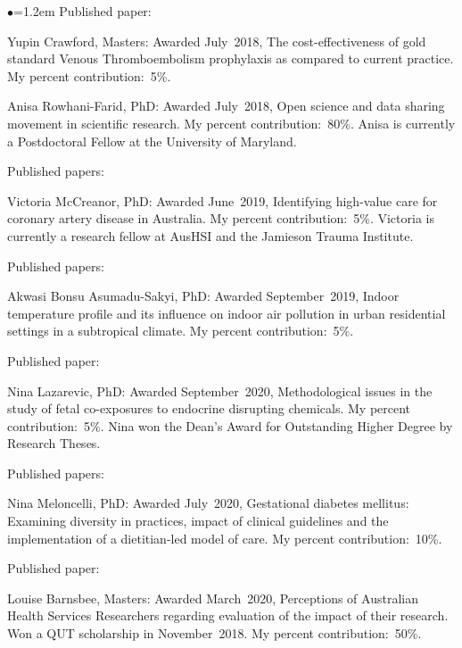\documentclass[a4paper,11pt]{article}
\renewcommand{\labelitemi}{$\bullet$}
\begin{document}
\begin{raggedright}
\begin{list}{\labelitemi}{\leftmargin=1.2em}
Published paper: 

\item Yupin Crawford, Masters: Awarded July~2018, The cost-effectiveness of gold standard Venous Thromboembolism prophylaxis as compared to current practice. My percent contribution:~5\%.

\item Anisa Rowhani-Farid, PhD: Awarded July~2018, Open science and data sharing movement in scientific research. My percent contribution:~80\%. Anisa is currently a Postdoctoral Fellow at the University of Maryland.

Published papers: 

\item Victoria McCreanor, PhD: Awarded June~2019, Identifying high-value care for coronary artery disease in Australia. My percent contribution:~5\%. Victoria is currently a research fellow at AusHSI and the Jamieson Trauma Institute.

Published papers: 

\item Akwasi Bonsu Asumadu-Sakyi, PhD: Awarded September~2019, Indoor temperature profile and its influence on indoor air pollution in urban residential settings in a subtropical climate. My percent contribution:~5\%.

Published paper: 

\item Nina Lazarevic, PhD: Awarded September~2020, Methodological issues in the study of fetal co-exposures to endocrine disrupting chemicals. My percent contribution:~5\%. Nina won the Dean’s Award for Outstanding Higher Degree by Research Theses.

 Published papers: 

\item Nina Meloncelli, PhD: Awarded July~2020, Gestational diabetes mellitus: Examining diversity in practices, impact of clinical guidelines and the implementation of a dietitian-led model of care. My percent contribution:~10\%.

Published paper: 

\item Louise Barnsbee, Masters: Awarded March~2020, Perceptions of Australian Health Services Researchers regarding evaluation of the impact of their research. Won a QUT scholarship in November~2018. My percent contribution:~50\%.


\end{list}
\end{raggedright}
\end{document}
